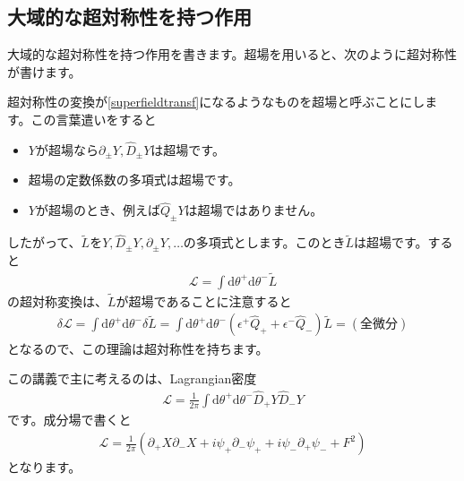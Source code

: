 \documentclass[report,paper=a4, fontsize=12pt, line_length=16cm, number_of_lines=33,dvipdfmx]{jlreq}
\numberwithin{equation}{chapter}
\numberwithin{equation}{section}
\newcommand{\del}{\partial}
\newcommand{\Lt}{\widetilde{L}}
\newcommand{\Lcal}{\mathcal{L}}
\newcommand{\di}{\mathrm{d}}
\newcommand{\Qd}{\widehat{Q}}
\newcommand{\Dd}{\widehat{D}}
\begin{document}
\subsection{大域的な超対称性を持つ作用}
大域的な超対称性を持つ作用を書きます。超場を用いると、次のように超対称性が書けます。

超対称性の変換が\eqref{superfieldtransf}になるようなものを超場と呼ぶことにします。この言葉遣いをすると
\begin{itemize}
  \item $Y$が超場なら$\del_{\pm}Y,\Dd_{\pm}Y$は超場です。
  \item 超場の定数係数の多項式は超場です。
  \item $Y$が超場のとき、例えば$\Qd_{\pm}Y$は超場ではありません。
\end{itemize}
したがって、$\Lt$を$Y,\Dd_{\pm}Y,\del_{\pm}Y,\dots$の多項式とします。このとき$\Lt$は超場です。すると
\begin{align}
  \Lcal=\int \di \theta^{+} \di \theta^{-} \Lt
\end{align}
の超対称変換は、$\Lt$が超場であることに注意すると
\begin{align}
  \delta \Lcal
  =\int \di \theta^{+} \di \theta^{-} \delta\Lt
  =\int \di \theta^{+} \di \theta^{-} (\epsilon^{+}\Qd_{+}+\epsilon^{-}\Qd_{-})\Lt
  =(\text{全微分})
\end{align}
となるので、この理論は超対称性を持ちます。

この講義で主に考えるのは、Lagrangian密度
\begin{align}
  \Lcal=\frac{1}{2\pi}\int \di \theta^{+} \di \theta^{-}\Dd_{+}Y\Dd_{-}Y
\end{align}
です。成分場で書くと
\begin{align}
  \Lcal=\frac{1}{2\pi}\left( 
    \del_{+}X\del_{-}X+i\psi_{+}\del_{-}\psi_{+}+i\psi_{-}\del_{+}\psi_{-}
    +F^2
   \right)\label{susylagrangian0}
\end{align}
となります。
\end{document}
